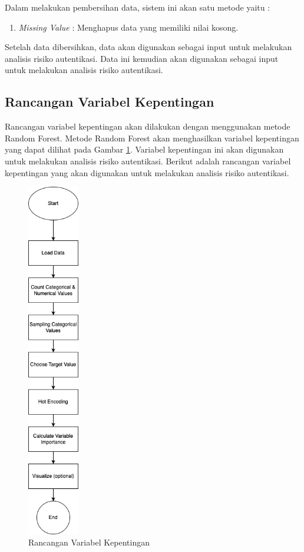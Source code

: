 Dalam melakukan pembersihan data, sistem ini akan satu metode yaitu :

\begin{enumerate}
    \item \textit{Missing Value} : Menghapus data yang memiliki nilai kosong.
\end{enumerate}

Setelah data dibersihkan, data akan digunakan sebagai input untuk melakukan analisis risiko autentikasi. Data ini kemudian akan digunakan sebagai input untuk melakukan analisis risiko autentikasi.

\subsection{Rancangan Variabel Kepentingan}
Rancangan variabel kepentingan akan dilakukan dengan menggunakan metode Random Forest. Metode Random Forest akan menghasilkan variabel kepentingan yang dapat dilihat pada Gambar \ref{fig:variabel-kepentingan}. Variabel kepentingan ini akan digunakan untuk melakukan analisis risiko autentikasi.
Berikut adalah rancangan variabel kepentingan yang akan digunakan untuk melakukan analisis risiko autentikasi.
\begin{figure}[H]
    \centering
    \includegraphics[width=0.2\textwidth]{contents/chapter-4/vim.drawio.png}
    \caption{Rancangan Variabel Kepentingan}
    \label{fig:variabel-kepentingan}
\end{figure}

